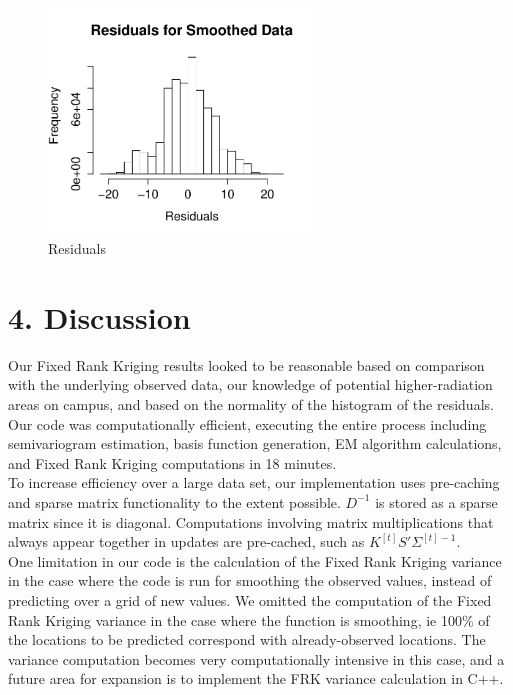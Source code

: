 \documentclass[11pt]{article}
\begin{document}
\begin{figure}[H]
\centering
\includegraphics[width=70mm,keepaspectratio]{Images/Residuals_for_smoothing.pdf}
\caption{Residuals \label{fig:10}}
\end{figure}



\newpage
\section{4. Discussion}

Our Fixed Rank Kriging results looked to be reasonable based on comparison with the underlying observed data, our knowledge of potential higher-radiation areas on campus, and based on the normality of the histogram of the residuals.  Our code was computationally efficient, executing the entire process including semivariogram estimation, basis function generation, EM algorithm calculations, and Fixed Rank Kriging computations in 18 minutes.\\

To increase efficiency over a large data set, our implementation uses pre-caching and sparse matrix functionality to the extent possible.  $D^{-1}$ is stored as a sparse matrix since it is diagonal.  Computations involving matrix multiplications that always appear together in updates are pre-cached, such as $K^{[t]}S'\Sigma^{[t]-1}$.\\

One limitation in our code is the calculation of the Fixed Rank Kriging variance in the case where the code is run for smoothing the observed values, instead of predicting over a grid of new values.  We omitted the computation of the Fixed Rank Kriging variance in the case where the function is smoothing, ie 100\% of the locations to be predicted correspond with already-observed locations.  The variance computation becomes very computationally intensive in this case, and a future area for expansion is to implement the FRK variance calculation in C++.\\
\end{document}
